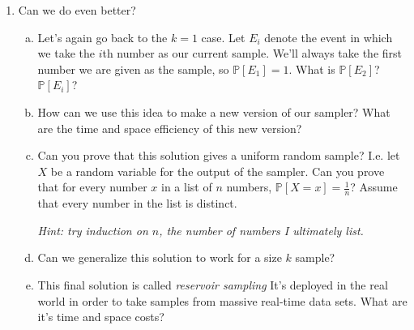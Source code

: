 \documentclass{article}
\begin{document}
\begin{enumerate}[1.]
\clearpage
\item %
  Can we do even better?

  \begin{enumerate}[a.]
  \item %
    Let's again go back to the $k=1$ case. Let $E_i$ denote the event in which
    we take the $i$th number as our current sample. We'll always take the first number we
    are given as the sample, so $\mathbb{P}[E_1] = 1$. What is
    $\mathbb{P}[E_2]$? $\mathbb{P}[E_i]$?

  \item %
    How can we use this idea to make a new version of our sampler? What are the
    time and space efficiency of this new version?

  \item %
    Can you prove that this solution gives a uniform random sample? I.e. let $X$
    be a random variable for the output of the sampler. Can you prove that for
    every number $x$ in a list of $n$ numbers, $\mathbb{P}[X = x] =
    \frac{1}{n}$? Assume that every number in the list is distinct.

    \textit{Hint: try induction on $n$, the number of numbers I ultimately list.}

  \item %
    Can we generalize this solution to work for a size $k$ sample?

  \item %
    This final solution is called \textit{reservoir sampling} It's deployed
    in the real world in order to take samples from massive real-time data sets.
    What are it's time and space costs?

  \end{enumerate}
\end{enumerate}
\end{document}

